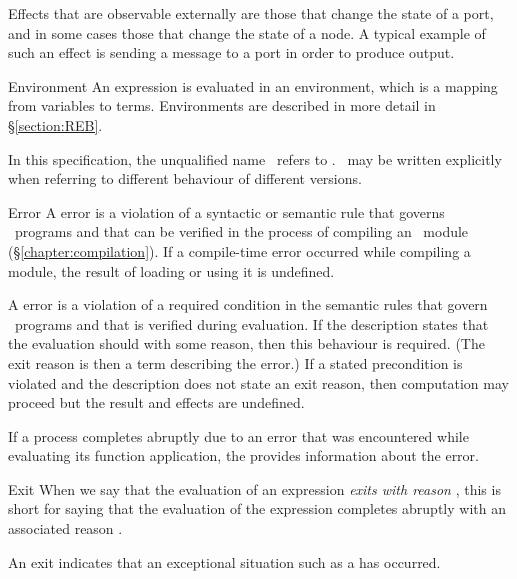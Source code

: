 \begin{Lentry}
Effects that are observable externally are those that change the state
of a port, and in some cases those that change the state of a node.  A
typical example of such an effect is sending a message to a port in
order to produce output.

\item[Environment]
An expression is evaluated in an environment, which is a mapping from
variables to terms.  Environments are described in more detail in
\S\ref{section:REB}.

\item[\Erlang]
In this specification, the unqualified name \Erlang\ refers to
\ifStd\StdErlang\else\OldErlang\fi.
\ifStd\StdErlang\else\OldErlang\fi\ may be written explicitly when
referring to different behaviour of different versions.

\item[Error]
A  error is a violation of a syntactic or semantic
rule that governs \Erlang\ programs and that can be verified in the
process of compiling an \Erlang\ module (\S\ref{chapter:compilation}).
If a compile-time error occurred while compiling a module, the result
of loading or using it is undefined.

A  error is a violation of a required condition in the
semantic rules that govern \Erlang\ programs and that is verified
during evaluation.  If the description states that the evaluation
should  with some reason, then this behaviour is required.
(The exit reason is then a term describing the error.)  If a stated
precondition is violated and the description does not state an exit
reason, then computation may proceed but the result and effects are
undefined.

If a process completes abruptly due to an error that was encountered
while evaluating its function application, the 
provides information about the error.

\item[Exit]
When we say that the evaluation of an expression \emph{exits with
reason }, this is short for saying that the evaluation of the
expression completes abruptly with an associated reason
.

An exit indicates that an exceptional situation such as a 
 has occurred.


\end{Lentry}
